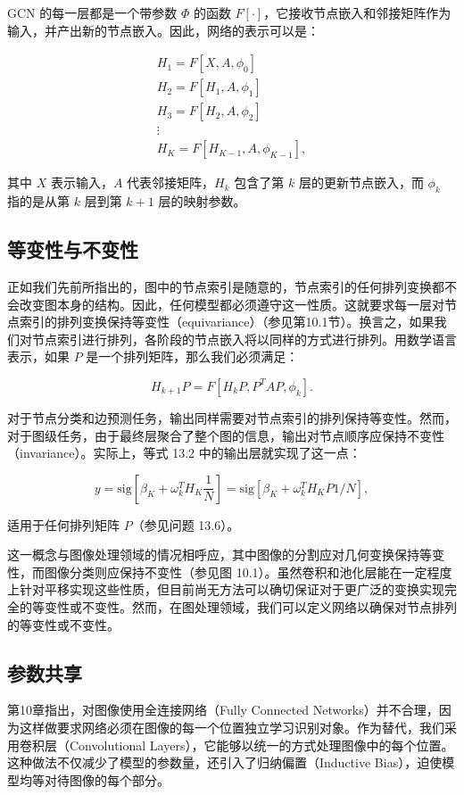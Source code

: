 GCN 的每一层都是一个带参数 \(\Phi\) 的函数 \(F[\cdot]\)，它接收节点嵌入和邻接矩阵作为输入，并产出新的节点嵌入。因此，网络的表示可以是：


\begin{align}
H_1 = F[X, A, \phi_0] \\
H_2 = F[H_1, A, \phi_1] \\
H_3 = F[H_2, A, \phi_2] \\
\vdots \\
H_K = F[H_{K-1}, A, \phi_{K-1}], 
\end{align} 


其中 \(X\) 表示输入，\(A\) 代表邻接矩阵，\(H_k\) 包含了第 \(k\) 层的更新节点嵌入，而 \(\phi_k\) 指的是从第 \(k\) 层到第 \(k+1\) 层的映射参数。

\subsection{等变性与不变性}
正如我们先前所指出的，图中的节点索引是随意的，节点索引的任何排列变换都不会改变图本身的结构。因此，任何模型都必须遵守这一性质。这就要求每一层对节点索引的排列变换保持等变性（equivariance）（参见第10.1节）。换言之，如果我们对节点索引进行排列，各阶段的节点嵌入将以同样的方式进行排列。用数学语言表示，如果 \(P\) 是一个排列矩阵，那么我们必须满足：

\begin{equation}
H_{k+1}P = F[H_kP, P^TAP, \phi_k]. 
\end{equation}

对于节点分类和边预测任务，输出同样需要对节点索引的排列保持等变性。然而，对于图级任务，由于最终层聚合了整个图的信息，输出对节点顺序应保持不变性（invariance）。实际上，等式 13.2 中的输出层就实现了这一点：

\begin{equation}
y = \text{sig}[\beta_K + \omega_k^T H_K \frac{1}{N}] = \text{sig}[\beta_K + \omega_k^T H_KP1/N], 
\end{equation}

适用于任何排列矩阵 \(P\)（参见问题 13.6）。

这一概念与图像处理领域的情况相呼应，其中图像的分割应对几何变换保持等变性，而图像分类则应保持不变性（参见图 10.1）。虽然卷积和池化层能在一定程度上针对平移实现这些性质，但目前尚无方法可以确切保证对于更广泛的变换实现完全的等变性或不变性。然而，在图处理领域，我们可以定义网络以确保对节点排列的等变性或不变性。
\subsection{参数共享}
第10章指出，对图像使用全连接网络（Fully Connected Networks）并不合理，因为这样做要求网络必须在图像的每一个位置独立学习识别对象。作为替代，我们采用卷积层（Convolutional Layers），它能够以统一的方式处理图像中的每个位置。这种做法不仅减少了模型的参数量，还引入了归纳偏置（Inductive Bias），迫使模型均等对待图像的每个部分。


